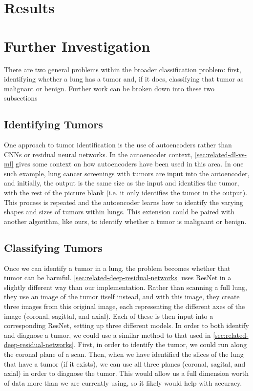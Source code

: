 \documentclass[10pt,twocolumn,letterpaper]{article}
\begin{document}
\section{Results} \label{sec:results}

\section{Further Investigation} \label{sec:further}

   There are two general problems within the broader classification problem: first, identifying whether a lung has a tumor and, if it does, classifying that tumor as malignant or benign. Further work can be broken down into these two subsections

	\subsection{Identifying Tumors} \label{sec:id-tumor}
	
		One approach to tumor identification is the use of autoencoders rather than CNNs or residual neural networks. In the autoencoder context, \ref{sec:related-dl-vs-ml} gives some context on how autoencoders have been used in this area. In one such example, lung cancer screenings with tumors are input into the autoencoder, and initially, the output is the same size as the input and identifies the tumor, with the rest of the picture blank (i.e. it only identifies the tumor in the output). This process is repeated and the autoencoder learns how to identify the varying shapes and sizes of tumors within lungs. This extension could be paired with another algorithm, like ours, to identify whether a tumor is malignant or benign. 
	
	\subsection{Classifying Tumors} \label{sec:classify-tumor}
	
		Once we can identify a tumor in a lung, the problem becomes whether that tumor can be harmful. \ref{sec:related-deep-residual-networks} uses ResNet in a slightly different way than our implementation. Rather than scanning a full lung, they use an image of the tumor itself instead, and with this image, they create three images from this original image, each representing the different axes of the image (coronal, sagittal, and axial). Each of these is then input into a corresponding ResNet, setting up three different models. In order to both identify and diagnose a tumor, we could use a similar method to that used in \ref{sec:related-deep-residual-networks}. First, in order to identify the tumor, we could run along the coronal plane of a scan. Then, when we have identified the slices of the lung that have a tumor (if it exists), we can use all three planes (coronal, sagital, and axial) in order to diagnose the tumor. This would allow us a full dimension worth of data more than we are currently using, so it likely would help with accuracy. 
\end{document}

